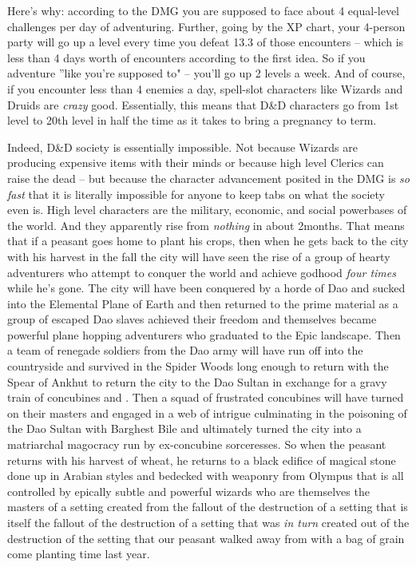 Here's why: according to the DMG you are supposed to face about 4 equal-level challenges per day of adventuring. Further, going by the XP chart, your 4-person party will go up a level every time you defeat 13.3 of those encounters -- which is less than 4 days worth of encounters according to the first idea. So if you adventure ''like you're supposed to" -- you'll go up 2 levels a week. And of course, if you encounter less than 4 enemies a day, spell-slot characters like Wizards and Druids are \textit{crazy} good. Essentially, this means that D\&D characters go from 1st level to 20th level in half the time as it takes to bring a pregnancy to term.

Indeed, D\&D society is essentially impossible. Not because Wizards are producing expensive items with their minds or because high level Clerics can raise the dead -- but because the character advancement posited in the DMG is \textit{so fast} that it is literally impossible for anyone to keep tabs on what the society even is. High level characters are the military, economic, and social powerbases of the world. And they apparently rise from \textit{nothing} in about 2\half months. That means that if a peasant goes home to plant his crops, then when he gets back to the city with his harvest in the fall the city will have seen the rise of a group of hearty adventurers who attempt to conquer the world and achieve godhood \textit{four times} while he's gone. The city will have been conquered by a horde of Dao and sucked into the Elemental Plane of Earth and then returned to the prime material as a group of escaped Dao slaves achieved their freedom and themselves became powerful plane hopping adventurers who graduated to the Epic landscape. Then a team of renegade soldiers from the Dao army will have run off into the countryside and survived in the Spider Woods long enough to return with the Spear of Ankhut to return the city to the Dao Sultan in exchange for a gravy train of concubines and . Then a squad of frustrated concubines will have turned on their masters and engaged in a web of intrigue culminating in the poisoning of the Dao Sultan with Barghest Bile and ultimately turned the city into a matriarchal magocracy run by ex-concubine sorceresses. So when the peasant returns with his harvest of wheat, he returns to a black edifice of magical stone done up in Arabian styles and bedecked with weaponry from Olympus that is all controlled by epically subtle and powerful wizards who are themselves the masters of a setting created from the fallout of the destruction of a setting that is itself the fallout of the destruction of a setting that was \textit{in turn} created out of the destruction of the setting that our peasant walked away from with a bag of grain come planting time last year.

